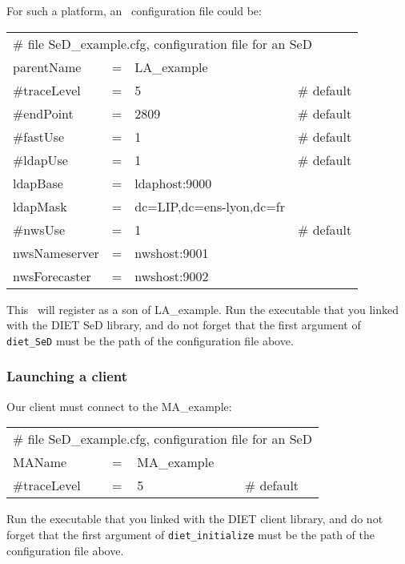 For such a platform, an \sed\ configuration file could be:
\tt
\begin{center}
 \footnotesize
 \begin{tabular}{lcll}
  \multicolumn{4}{l}{\# file SeD\_example.cfg, configuration file for an SeD}\\
  parentName   &=&LA\_example        &\\
  \#traceLevel &=&5                 &\# default\\
  \#endPoint   &=&2809              &\# default\\
  \#fastUse    &=&1                 &\# default\\
  \#ldapUse    &=&1                 &\# default\\
  ldapBase     &=&ldaphost:9000     &\\
  ldapMask     &=&dc=LIP,dc=ens-lyon,dc=fr&\\
  \#nwsUse     &=&1                 &\# default\\
  nwsNameserver&=&nwshost:9001      &\\
  nwsForecaster&=&nwshost:9002      &\\
 \end{tabular}
\end{center}
\rm

This \sed\ will register as a son of LA\_example. Run the executable that you
linked with the DIET SeD library, and do not forget that the first argument of
\texttt{diet\_SeD} must be the path of the configuration file above.


\subsubsection{Launching a client}

Our client must connect to the MA\_example:
\tt
\begin{center}
 \footnotesize
 \begin{tabular}{lcll}
  \multicolumn{4}{l}{\# file SeD\_example.cfg, configuration file for an SeD}\\
  MAName       &=&MA\_example        &\\
  \#traceLevel &=&5                 &\# default\\
 \end{tabular}
\end{center}
\rm

Run the executable that you linked with the DIET client library, and do not
forget that the first argument of \texttt{diet\_initialize} must be the path of
the configuration file above.

